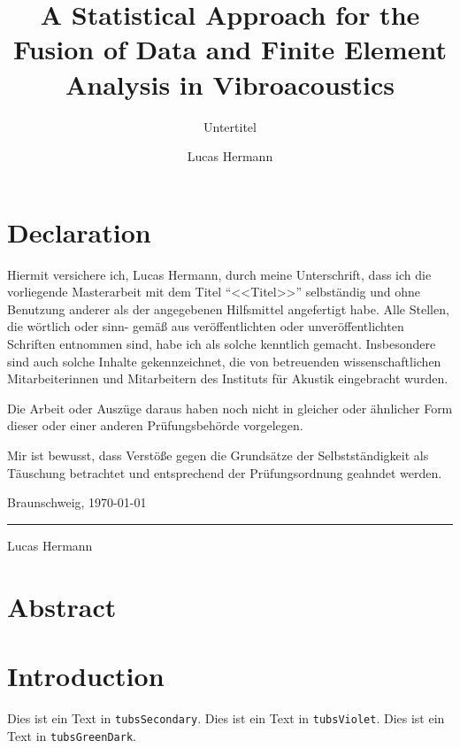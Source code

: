 \documentclass[%
  a4paper,oneside,%
  11pt,%
  smallchapters,
  green,%
  rgb, <cmyk>
  ,]{tubsbook}
\title{A Statistical Approach for the Fusion of Data and
Finite Element Analysis in Vibroacoustics}
\subtitle{Untertitel}
\author{Lucas Hermann}
\begin{document}


\chapter*{Declaration}
Hiermit versichere ich, Lucas Hermann, durch meine Unterschrift, dass ich die
vorliegende Masterarbeit mit dem Titel ``<<Titel>>'' selbständig und ohne Benutzung
anderer als der angegebenen Hilfsmittel angefertigt habe. Alle Stellen, die wörtlich oder sinn-
gemäß aus veröffentlichten oder unveröffentlichten Schriften entnommen sind, habe ich als
solche kenntlich gemacht. Insbesondere sind auch solche Inhalte gekennzeichnet, die von
betreuenden wissenschaftlichen Mitarbeiterinnen und Mitarbeitern des Instituts für Akustik eingebracht wurden.

Die Arbeit oder Auszüge daraus haben noch nicht in gleicher oder ähnlicher Form dieser
oder einer anderen Prüfungsbehörde vorgelegen.

Mir ist bewusst, dass Verstöße gegen die Grundsätze der Selbstständigkeit als Täuschung
betrachtet und entsprechend der Prüfungsordnung geahndet werden.

\begin{flushright}
Braunschweig, \today
\end{flushright}

\vspace{2cm}
\hspace{2cm}\rule{5cm}{1pt}

\hspace{2cm}\small{Lucas Hermann} 

\chapter*{Abstract}
\lipsum[1]

\tableofcontents


\chapter{Introduction}

\textcolor{tubsSecondary}{Dies ist ein Text in \texttt{tubsSecondary}.}
\textcolor{tubsViolet}{Dies ist ein Text in \texttt{tubsViolet}.}
\textcolor{tubsGreenDark}{Dies ist ein Text in \texttt{tubsGreenDark}.}\bigskip
\end{document}
